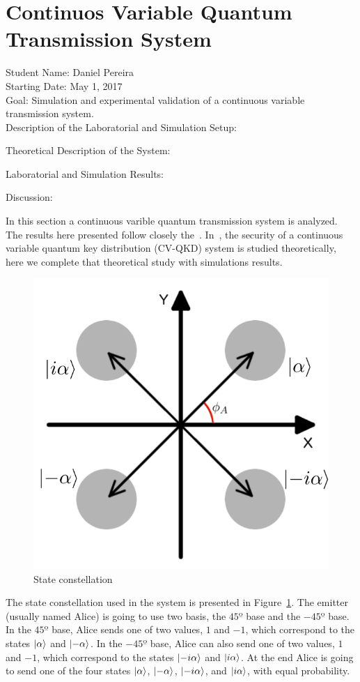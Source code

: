 
\clearpage
\section{Continuos Variable Quantum Transmission System}\label{sec:intro}

Student Name: Daniel Pereira\\

Starting Date: May 1, 2017\\

Goal: Simulation and experimental validation of a continuous variable transmission system.\\

Description of the Laboratorial and Simulation Setup:


Theoretical Description of the System:


Laboratorial and Simulation Results:


Discussion:

In this section a continuous varible quantum transmission system is analyzed.
The results here presented follow closely the~\cite{namiki2003security}.
In~\cite{namiki2003security}, the security of a continuous variable quantum key distribution (CV-QKD) system is studied theoretically, here we complete that theoretical study with simulations results.

\begin{figure}[h]
\centering
\includegraphics[width=.5\linewidth]{./sdf/cv_system/figures/constellation.png}
\caption{State constellation}
\label{fig:const}
\end{figure}

The state constellation used in the system is presented in Figure~\ref{fig:const}.
The emitter (usually named Alice) is going to use two basis, the $45º$ base and the $-45º$ base.
In the $45º$ base, Alice sends one of two values, $1$ and $-1$, which correspond to the states $\ket{\alpha}$ and $\ket{-\alpha}$.
In the $-45º$ base, Alice can also send one of two values, $1$ and $-1$, which correspond to the states $\ket{-i\alpha}$ and $\ket{i\alpha}$.
At the end Alice is going to send one of the four states $\ket{\alpha}$, $\ket{-\alpha}$, $\ket{-i\alpha}$, and $\ket{i\alpha}$, with equal probability.

